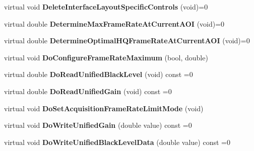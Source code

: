 \begin{DoxyCompactItemize}
\item 
\hypertarget{class_wizard_quick_setup_aecc027f9056cbc79df50a8a82b20babf}{virtual void {\bfseries Delete\+Interface\+Layout\+Specific\+Controls} (void)=0}\label{class_wizard_quick_setup_aecc027f9056cbc79df50a8a82b20babf}

\item 
\hypertarget{class_wizard_quick_setup_ad176d19a825f93ce879397c8311e4d6e}{virtual double {\bfseries Determine\+Max\+Frame\+Rate\+At\+Current\+A\+O\+I} (void)=0}\label{class_wizard_quick_setup_ad176d19a825f93ce879397c8311e4d6e}

\item 
\hypertarget{class_wizard_quick_setup_a496cf9f65da559b470a978f326515b27}{virtual double {\bfseries Determine\+Optimal\+H\+Q\+Frame\+Rate\+At\+Current\+A\+O\+I} (void)=0}\label{class_wizard_quick_setup_a496cf9f65da559b470a978f326515b27}

\item 
\hypertarget{class_wizard_quick_setup_a3418ff0604684bfd6eddd609ab1b283b}{virtual void {\bfseries Do\+Configure\+Frame\+Rate\+Maximum} (bool, double)}\label{class_wizard_quick_setup_a3418ff0604684bfd6eddd609ab1b283b}

\item 
\hypertarget{class_wizard_quick_setup_a56de4f1e4be097b56df06230511aaadc}{virtual double {\bfseries Do\+Read\+Unified\+Black\+Level} (void) const =0}\label{class_wizard_quick_setup_a56de4f1e4be097b56df06230511aaadc}

\item 
\hypertarget{class_wizard_quick_setup_a95fb2a2ad75f9eb123c466ab9e3ae43d}{virtual double {\bfseries Do\+Read\+Unified\+Gain} (void) const =0}\label{class_wizard_quick_setup_a95fb2a2ad75f9eb123c466ab9e3ae43d}

\item 
\hypertarget{class_wizard_quick_setup_ac6bf1772933aa2f54f5a0e31506c2749}{virtual void {\bfseries Do\+Set\+Acquisition\+Frame\+Rate\+Limit\+Mode} (void)}\label{class_wizard_quick_setup_ac6bf1772933aa2f54f5a0e31506c2749}

\item 
\hypertarget{class_wizard_quick_setup_a2acf3a18000cb7b978747fc07ad9c630}{virtual void {\bfseries Do\+Write\+Unified\+Gain} (double value) const =0}\label{class_wizard_quick_setup_a2acf3a18000cb7b978747fc07ad9c630}

\item 
\hypertarget{class_wizard_quick_setup_a714e651d89c29d18ab596d016605fa15}{virtual void {\bfseries Do\+Write\+Unified\+Black\+Level\+Data} (double value) const =0}\label{class_wizard_quick_setup_a714e651d89c29d18ab596d016605fa15}


\end{DoxyCompactItemize}
